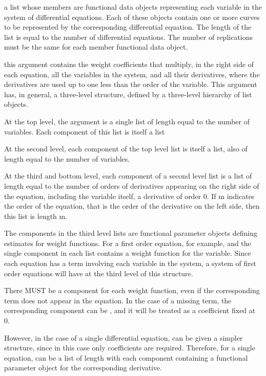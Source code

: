 \begin{Arguments}
\begin{ldescription}
\item[\code{xfdlist}] a list whose members are functional data objects representing each
variable in the system of differential equations.  Each of these objects
contain one or more curves to be represented by the corresponding differential 
equation.  The length of the list is equal to the number of 
differential equations. The number  of replications must be
the same for each member functional data object.

\item[\code{bwtlist}] this argument contains the weight coefficients that multiply, in the right
side of each equation, all the variables in the system, and all their 
derivatives, where the derivatives are used up to one less than the order
of the variable.   This argument has, in general, a three-level structure,
defined by a three-level hierarchy of list objects.  

At the top level, the argument is a single list of length equal to the number of 
variables. Each component of this list is itself a list 

At the second level, each component of the top level list is itself a list, also 
of length equal to the number of variables.  

At the third and bottom level, each component of a second level list is a list 
of length equal to the number of orders of derivatives appearing on the right       
side of the equation, including  the variable itself, a derivative of order 0. 
If m indicates the order of the equation, that is the order of the derivative
on the left side, then this list is length m.  

The components in the third level lists are functional parameter objects
defining estimates for weight functions.  For a first order equation,
for example,  and the single component in each list contains a weight 
function for the variable.  Since each equation has a term involving each
variable in the system, a system of first order equations will have 
at the third level of this structure.

There MUST be a component for each weight function, even if the corresponding  
term does not appear in the equation.  In the case of a missing term, the 
corresponding component can be , and it will be treated as a 
coefficient fixed at 0.  

However, in the case of a single differential equation,  can be
given a simpler structure, since in this case only  coefficients are
required.  Therefore, for a single equation,  can be a list
of length  with each component containing a functional parameter 
object for the corresponding derivative. 


\end{ldescription}
\end{Arguments}
